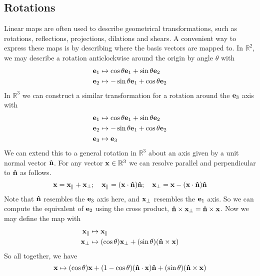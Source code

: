 \subsection{Rotations}
Linear maps are often used to describe geometrical transformations, such as rotations, reflections, projections, dilations and shears.
A convenient way to express these maps is by describing where the basis vectors are mapped to.
In \(\mathbb R^2\), we may describe a rotation anticlockwise around the origin by angle \(\theta\) with
\begin{align*}
	\vb e_1 & \mapsto \cos \theta \vb e_1 + \sin \theta \vb e_2  \\
	\vb e_2 & \mapsto -\sin \theta \vb e_1 + \cos \theta \vb e_2
\end{align*}
In \(\mathbb R^3\) we can construct a similar transformation for a rotation around the \(\vb e_3\) axis with
\begin{align*}
	\vb e_1 & \mapsto \cos \theta \vb e_1 + \sin \theta \vb e_2  \\
	\vb e_2 & \mapsto -\sin \theta \vb e_1 + \cos \theta \vb e_2 \\
	\vb e_3 & \mapsto \vb e_3
\end{align*}
We can extend this to a general rotation in \(\mathbb R^3\) about an axis given by a unit normal vector \(\hat {\vb n}\).
For any vector \(\vb x \in \mathbb R^3\) we can resolve parallel and perpendicular to \(\vu{n}\) as follows.
\[
	\vb x = \vb x_\parallel + \vb x_\perp;\quad \vb x_\parallel = (\vb x \cdot \vu{n}) \vu{n};\quad \vb x_\perp = \vb x - (\vb x \cdot \vu{n}) \vu{n}
\]
Note that \(\vu{n}\) resembles the \(\vb e_3\) axis here, and \(\vb x_\perp\) resembles the \(\vb e_1\) axis.
So we can compute the equivalent of \(\vb e_2\) using the cross product, \(\vu{n} \times \vb x_\perp = \vu{n} \times \vb x\).
Now we may define the map with
\begin{align*}
	\vb x_\parallel & \mapsto \vb x_\parallel                                               \\
	\vb x_\perp     & \mapsto (\cos \theta) \vb x_\perp + (\sin \theta)(\vu{n} \times \vb x)
\end{align*}
So all together, we have
\[
	\vb x \mapsto (\cos \theta) \vb x + (1 - \cos \theta) (\vu{n} \cdot \vb x)\vu{n} + (\sin \theta)(\vu{n} \times \vb x)
\]

